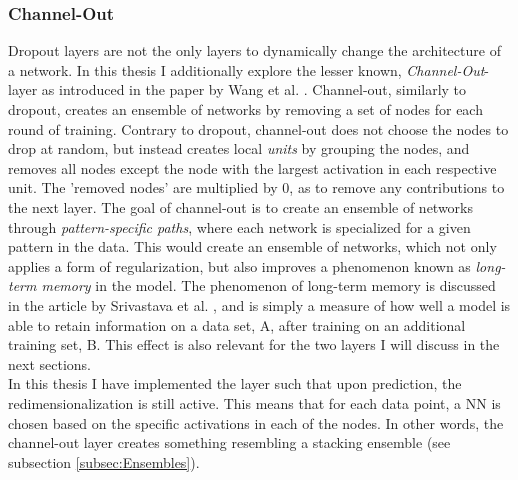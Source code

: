 \subsubsection*{Channel-Out}\label{subsubsec:Channel-Out}
Dropout layers are not the only layers to dynamically change the architecture of a network. In this thesis I additionally 
explore the lesser known, \emph{Channel-Out}-layer as introduced in the paper by Wang et al. \cite{wang_maxout_2013}. 
Channel-out, similarly to dropout, creates an ensemble of networks by removing a set 
of nodes for each round of training. Contrary to dropout, channel-out does not choose the nodes to drop at random,
but instead creates local \emph{units} by grouping the nodes, and removes all nodes except the node with the largest
activation in each respective unit. The 'removed nodes' are multiplied by 0, as to remove any contributions to the next layer.
The goal of channel-out is to create an ensemble of networks through \emph{pattern-specific paths},
where each network is specialized for a given pattern in the data. This would create an ensemble of networks, which not only applies a form of 
regularization, but also improves a phenomenon known as \emph{long-term memory} in the model. The phenomenon of long-term memory is discussed in 
the article by Srivastava et al. \cite{srivastava_compete_2013}, and is simply a measure of how well a model is able to retain information on a data set, A, after 
training on an additional training set, B. This effect is also relevant for the two layers I will discuss in the next sections.
\\
In this thesis I have implemented the layer such that upon prediction, the redimensionalization 
is still active. This means that for each data point, a \ac{NN} is chosen based on the specific activations in 
each of the nodes. In other words, the channel-out layer creates something resembling a stacking ensemble (see subsection 
\ref{subsec:Ensembles}). 
